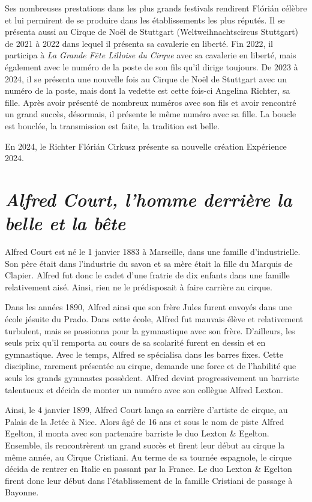 Ses nombreuses prestations dans les plus grands festivals rendirent Flórián célèbre et lui permirent de se produire dans les établissements les plus réputés. Il se présenta aussi au Cirque de Noël de Stuttgart (Weltweihnachtscircus Stuttgart) de 2021 à 2022 dans lequel il présenta sa cavalerie en liberté. Fin 2022, il participa à \textit{La Grande Fête Lilloise du Cirque} avec sa cavalerie en liberté, mais également avec le numéro de la poste de son fils qu’il dirige toujours. De 2023 à 2024, il se présenta une nouvelle fois au Cirque de Noël de Stuttgart avec un numéro de la poste, mais dont la vedette est cette fois-ci Angelina Richter, sa fille. Après avoir présenté de nombreux numéros avec son fils et avoir rencontré un grand succès, désormais, il présente le même numéro avec sa fille. La boucle est bouclée, la transmission est faite, la tradition est belle. 

En 2024, le Richter Flórián Cirkusz présente sa nouvelle création Expérience 2024. 

\section*{\textit{Alfred Court, l’homme derrière la belle et la bête}}
{}

Alfred Court est né le 1 janvier 1883 à Marseille, dans une famille d’industrielle. Son père était dans l’industrie du savon et sa mère était la fille du Marquis de Clapier. Alfred fut donc le cadet d’une fratrie de dix enfants dans une famille relativement aisé. Ainsi, rien ne le prédisposait à faire carrière au cirque.

Dans les années 1890, Alfred ainsi que son frère Jules furent envoyés dans une école jésuite du Prado. Dans cette école, Alfred fut mauvais élève et relativement turbulent, mais se passionna pour la gymnastique avec son frère. D’ail\-leurs, les seuls prix qu’il remporta au cours de sa scolarité furent en dessin et en gymnastique. Avec le temps, Alfred se spécialisa dans les barres fixes. Cette discipline, rarement présentée au cirque, demande une force et de l’habilité que seuls les grands gymnastes possèdent. Alfred devint progressivement un barriste talentueux et décida de monter un numéro avec son collègue Alfred Lexton.

Ainsi, le 4 janvier 1899, Alfred Court lança sa carrière d’artiste de cirque, au Palais de la Jetée à Nice. Alors âgé de 16 ans et sous le nom de piste Alfred Egelton, il monta avec son partenaire barriste le duo Lexton \& Egelton. Ensemble, ils rencontrèrent un grand succès et firent leur début au cirque la même année, au Cirque Cristiani. Au terme de sa tournée espagnole, le cirque décida de rentrer en Italie en passant par la France. Le duo Lexton \& Egelton firent donc leur début dans l’établissement de la famille Cristiani de passage à Bayonne.

